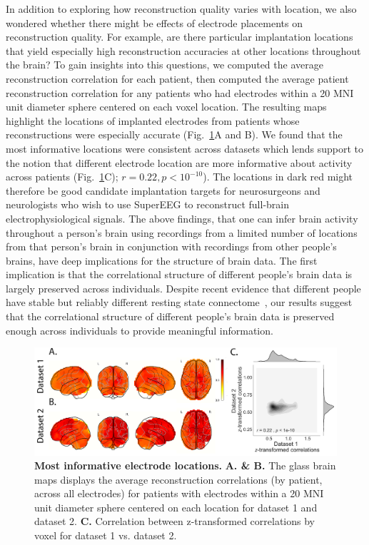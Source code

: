 \documentclass[11pt]{article}
\begin{document}
In addition to exploring how reconstruction quality varies with
location, we also wondered whether there might be effects of electrode
placements on reconstruction quality.  For example, are there
particular implantation locations that yield especially high
reconstruction accuracies at other locations throughout the brain? To gain insights into this questions, we computed the average reconstruction correlation for each patient, then computed the average patient reconstruction correlation for any patients who had electrodes within a 20 MNI unit diameter sphere centered on each voxel location. The resulting maps highlight the locations of implanted electrodes from patients whose
reconstructions were especially accurate  (Fig.~\ref{fig:informap}A and B). We found that the most informative locations were consistent across datasets which lends support to the notion that different electrode location are more informative about activity across patients (Fig.~\ref{fig:informap}C); $r = 0.22, p < 10^{-10}$).  The locations in dark red might therefore be good candidate
implantation targets for neurosurgeons and neurologists who wish to
use SuperEEG to reconstruct full-brain electrophysiological signals.
The above findings, that one can infer brain activity throughout a person's brain 
using recordings from a limited number of locations from that person's brain in conjunction with recordings from other people's brains, have deep
implications for the structure of brain data.  The first implication
is that the correlational structure of different people's brain data
is largely preserved across individuals. Despite recent evidence that different people have stable but reliably different resting state connectome~\cite{FinnEtal15}, our results suggest that the correlational structure of different people's brain data is preserved enough across individuals to provide meaningful information. 

\begin{figure}
  \centering
  \includegraphics[width=\textwidth]{figs/informap}
  \caption{\textbf{Most informative electrode locations.} \textbf{A. \& B. } The glass
    brain maps displays the average reconstruction correlations (by patient, across
    all electrodes) for patients with electrodes within a 20 MNI unit diameter sphere centered on
    each location for dataset 1 and dataset 2. \textbf{C.} Correlation between z-transformed correlations by voxel for dataset 1 vs. dataset 2.}
  \label{fig:informap}
\end{figure}
\end{document}
